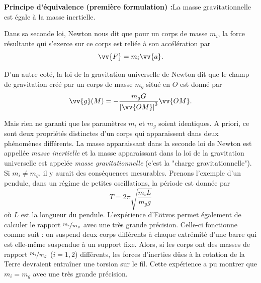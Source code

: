 \documentclass[a4paper,11pt]{report}
\theoremstyle{definition}
\theoremstyle{plain}
\theoremstyle{definition}
\theoremstyle{remark}
\begin{document}
            \begin{leftbar}
                \textbf{Principe d'équivalence (première formulation) :}\quad La masse gravitationnelle est égale à la masse inertielle.
            \end{leftbar}
            
            Dans sa seconde loi, Newton nous dit que pour un corps de masse $m_i$, la force résultante qui s'exerce sur ce corps est reliée à son accélération par
            \begin{equation}
                \vv{F} = m_i\vv{a}.
            \end{equation}
            
            D'un autre coté, la loi de la gravitation universelle de Newton dit que le champ de gravitation créé par un corps de masse $m_g$ situé en $O$ est donné par
            \begin{equation}
                \vv{g}(M) = -\frac{m_g G}{\abs{\vv{OM}}^3}\vv{OM}.
            \end{equation}
            
            Mais rien ne garanti que les paramètres $m_i$ et $m_g$ soient identiques. A priori, ce sont deux propriétés distinctes d'un corps qui apparaissent dans deux phénomènes différents. La masse apparaissant dans la seconde loi de Newton est appellée \textit{masse inertielle} et la masse apparaissant dans la loi de la gravitation universelle est appelée \textit{masse gravitationnelle} (c'est la "charge gravitationnelle").\\
            
            Si $m_i\neq m_g$, il y aurait des conséquences mesurables. Prenons l'exemple d'un pendule, dans un régime de petites oscillations, la période est donnée par
            \begin{equation}
                T = 2\pi\sqrt{\frac{m_iL}{m_g g}}
            \end{equation}
            où $L$ est la longueur du pendule. L'expérience d'Eötvos permet également de calculer le rapport $\nicefrac{m_i}{m_g}$ avec une très grande précision. Celle-ci fonctionne comme suit : on suspend deux corps différents à chaque extrémité d'une barre qui est elle-même suspendue à un support fixe. Alors, si les corps ont des masses de rapport $\nicefrac{m_i}{m_g}$ ($i = 1, 2$) différents, les forces d'inerties dûes à la rotation de la Terre devraient entraîner une torsion sur le fil. Cette expérience a pu montrer que $m_i = m_g$ avec une très grande précision.\\
            
\end{document}
